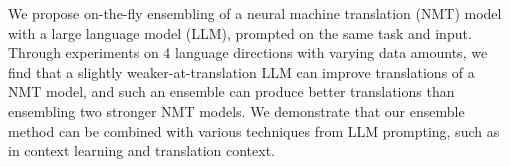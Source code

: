 We propose on-the-fly ensembling of a neural machine translation (NMT) model with a large language model (LLM), prompted on the same task and input.  Through experiments on 4 language directions with varying data amounts, we find that a slightly weaker-at-translation LLM can improve translations of a NMT model, and such an ensemble can produce better translations than ensembling two stronger NMT models. We demonstrate that our ensemble method can be combined  with various techniques from LLM prompting, such as in context learning and translation context.